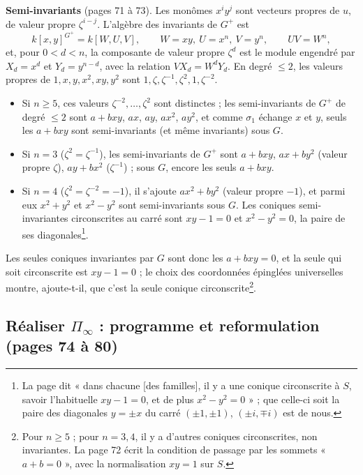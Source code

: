 \documentclass[11pt,a4paper]{article}
\begin{document}
\textbf{Semi-invariants} (pages 71 à 73). Les monômes $x^i y^j$ sont vecteurs
propres de $u$, de valeur propre $\zeta^{i-j}$. L'algèbre des invariants de
$G^{+}$ est
\[
  k[x, y]^{G^{+}} = k[W, U, V], \qquad W = xy,\ U = x^n,\ V = y^n,\qquad UV =
  W^n ,
\]
et, pour $0 < d < n$, la composante de valeur propre $\zeta^d$ est le module
engendré par $X_d = x^d$ et $Y_d = y^{n-d}$, avec la relation $V X_d = W^d
Y_d$. En degré $\leq 2$, les valeurs propres de $1, x, y, x^2, xy, y^2$ sont
$1, \zeta, \zeta^{-1}, \zeta^2, 1, \zeta^{-2}$.
\begin{itemize}
  \item Si $n \geq 5$, ces valeurs $\zeta^{-2}, \ldots, \zeta^2$ sont
    distinctes ; les semi-invariants de $G^{+}$ de degré $\leq 2$ sont $a +
    bxy$, $ax$, $ay$, $ax^2$, $ay^2$, et comme $\sigma_1$ échange $x$ et $y$,
    seuls les $a + bxy$ sont semi-invariants (et même invariants) sous $G$.
  \item Si $n = 3$ ($\zeta^2 = \zeta^{-1}$), les semi-invariants de $G^{+}$
    sont $a + bxy$, $ax + by^2$ (valeur propre $\zeta$), $ay + bx^2$
    ($\zeta^{-1}$) ; sous $G$, encore les seuls $a + bxy$.
  \item Si $n = 4$ ($\zeta^2 = \zeta^{-2} = -1$), il s'ajoute $ax^2 + by^2$
    (valeur propre $-1$), et parmi eux $x^2 + y^2$ et $x^2 - y^2$ sont
    semi-invariants sous $G$. Les coniques semi-invariantes circonscrites au
    carré sont $xy - 1 = 0$ et $x^2 - y^2 = 0$, la paire de ses
    diagonales\footnote{La page dit « dans chacune [des familles], il y a une
    conique circonscrite à $S$, savoir l'habituelle $xy - 1 = 0$, et de plus
    $x^2 - y^2 = 0$ » ; que celle-ci soit la paire des diagonales $y = \pm x$
    du carré $(\pm 1, \pm 1)$, $(\pm i, \mp i)$ est de nous.}.
\end{itemize}
Les seules coniques invariantes par $G$ sont donc les $a + bxy = 0$, et la
seule qui soit circonscrite est $xy - 1 = 0$ ; le choix des coordonnées
épinglées universelles montre, ajoute-t-il, que c'est la seule conique
circonscrite\footnote{Pour $n \geq 5$ ; pour $n = 3, 4$, il y a d'autres
coniques circonscrites, non invariantes. La page 72 écrit la condition de
passage par les sommets « $a + b = 0$ », avec la normalisation $xy = 1$ sur
$S$.}.

\subsection*{Réaliser $\Pi_\infty$ : programme et reformulation (pages 74 à 80)}
\end{document}
